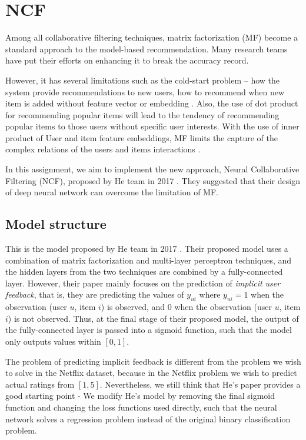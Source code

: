 \documentclass[final]{cvpr}
\begin{document}
\section{\ac{NCF}}

Among all collaborative filtering techniques, matrix factorization (MF) become a standard approach to the model-based recommendation. Many research teams have put their efforts on enhancing it to break the accuracy record. 

However, it has several limitations such as the cold-start problem -- how the system provide recommendations to new users, how to recommend when new item is added without feature vector or embedding \cite{FMF}. Also, the use of dot product for recommending popular items will lead to the tendency of recommending popular items to those users without specific user interests. With the use of inner product of User and item feature embeddings, MF limits the capture of the complex relations  of the users and items interactions \cite{he2017neural}.

In this assignment, we aim to implement the new approach, Neural Collaborative Filtering (NCF), proposed by He team in 2017 \cite{he2017neural}. They suggested that their design of deep neural network can overcome the limitation of MF.

\subsection{Model structure}

This is the model proposed by He team in 2017 \cite{he2017neural}. Their proposed model uses a combination of matrix factorization and multi-layer perceptron techniques, and the hidden layers from the two techniques are combined by a fully-connected layer. However, their paper mainly focuses on the prediction of \textit{implicit user feedback}, that is, they are predicting the values of $y_{ui}$ where $y_{ui}=1$ when the observation (user $u$, item $i$) is observed, and $0$ when the
observation (user $u$, item $i$) is not observed. Thus, at the final stage of their proposed model, the output of the fully-connected layer is passed into a sigmoid function, such that the model only outputs values within $[0, 1]$. 

The problem of predicting implicit feedback is different from the problem we wish to solve in the Netflix dataset, because in the Netflix problem we wish to predict actual ratings from $[1, 5]$.
Nevertheless, we still think that He's paper provides a good starting point - We modify He's model by removing the final sigmoid function and changing the loss functions used directly, such that the neural network solves a regression problem instead of the original binary
classification problem.
\end{document}
